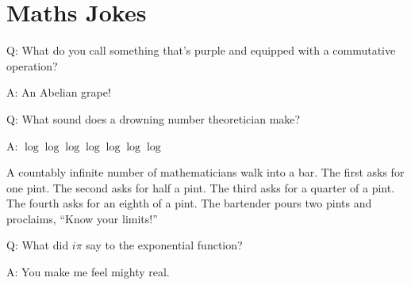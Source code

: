 \section{Maths Jokes}

Q: What do you call something that's purple and equipped with a commutative
operation?

A: An Abelian grape!

Q: What sound does a drowning number theoretician make?

A: \(\log \log \log \log \log \log \log\)

A countably infinite number of mathematicians walk into a bar.
{The first asks for one pint.
\footnotesize The second asks for half a pint.
\scriptsize The third asks for a quarter of a pint.
\tiny The fourth asks for an eighth of a pint}.
The bartender pours two pints and proclaims, ``Know your limits!''

Q: What did \(i \pi\) say to the exponential function?

A: You make me feel mighty real.

